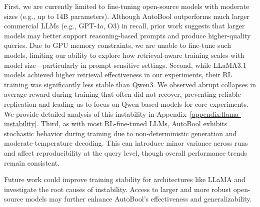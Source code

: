 First, we are currently limited to fine-tuning open-source models with moderate sizes (e.g., up to 14B parameters). Although AutoBool outperforms much larger commercial LLMs (e.g., GPT-4o, O3) in recall, prior work suggests that larger models may better support reasoning-based prompts and produce higher-quality queries. Due to GPU memory constraints, we are unable to fine-tune such models, limiting our ability to explore how retrieval-aware training scales with model size—particularly in prompt-sensitive settings.
Second, while LLaMA3.1 models achieved higher retrieval effectiveness in our experiments, their RL training was significantly less stable than Qwen3. We observed abrupt collapses in average reward during training that often did not recover, preventing reliable replication and leading us to focus on Qwen-based models for core experiments. We provide detailed analysis of this instability in Appendix~\ref{appendix:llama-instability}.
Third, as with most RL-fine-tuned LLMs, AutoBool exhibits stochastic behavior during training due to non-deterministic generation and moderate-temperature decoding. This can introduce minor variance across runs and affect reproducibility at the query level, though overall performance trends remain consistent.

Future work could improve training stability for architectures like LLaMA and investigate the root causes of instability. Access to larger and more robust open-source models may further enhance AutoBool’s effectiveness and generalizability.

